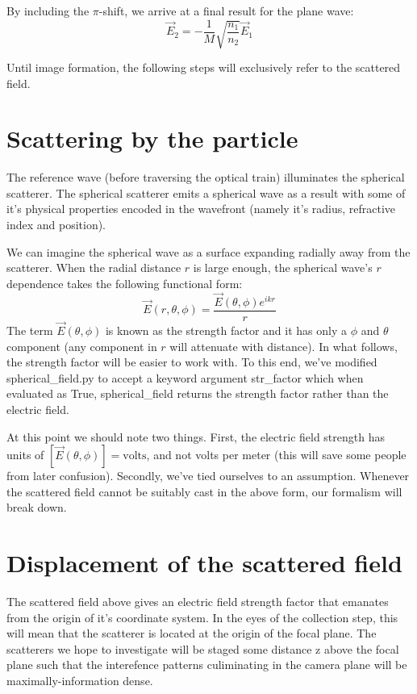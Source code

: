   By including the $\pi$-shift, we arrive at a final result for the plane wave:
  \begin{equation*}
    \vec{E}_2 = -\frac{1}{M}\sqrt{\frac{n_1}{n_2}} \vec{E}_1     
  \end{equation*}

  Until image formation, the following steps will exclusively refer to the 
  scattered field.

\section{Scattering by the particle}
  The reference wave (before traversing the optical train) illuminates the 
  spherical scatterer. The spherical scatterer emits a spherical wave
  as a result with some of it's physical properties encoded in the wavefront
  (namely it's radius, refractive index and position). 

  We can imagine the spherical wave as a surface expanding radially away
  from the scatterer. When the radial distance $r$ is large enough, the
  spherical wave's $r$ dependence takes the following functional form:
  \begin{equation*}
    \vec{E}(r, \theta, \phi) = \frac{\vec{E}(\theta, \phi)e^{ikr}}{r}
  \end{equation*}
  The term $\vec{E}(\theta, \phi)$ is known as the strength factor and it
  has only a $\phi$ and $\theta$ component (any component in $r$ will attenuate
  with distance). In what follows, the strength factor will be easier to work
  with. To this end, we've modified spherical\_field.py to accept a keyword 
  argument str\_factor which when evaluated as True, spherical\_field returns 
  the strength factor rather than the electric field.

  At this point we should note two things. First, the electric field strength
  has units of $ \left [ \vec{E}(\theta, \phi) \right ] = \text{volts}$, and not 
  volts per meter (this will save some people from later confusion). Secondly,
  we've tied ourselves to an assumption. 
  Whenever the scattered field cannot be suitably cast in the above form,
  our formalism will break down.

\section{ Displacement of the scattered field}
  The scattered field above gives an electric field strength factor that
  emanates from the origin of it's coordinate system. In the eyes of the
  collection step, this will mean that the scatterer is located at the origin
  of the focal plane. The scatterers we hope to investigate will be staged 
  some distance z above the focal plane such that the interefence patterns 
  culiminating in the camera plane will be maximally-information dense.

